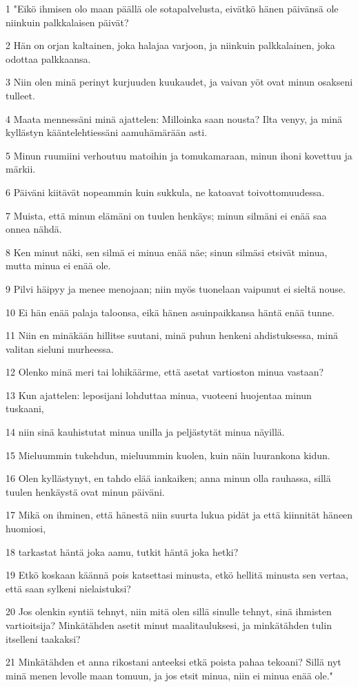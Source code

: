 \par 1 "Eikö ihmisen olo maan päällä ole sotapalvelusta, eivätkö hänen päivänsä ole niinkuin palkkalaisen päivät?
\par 2 Hän on orjan kaltainen, joka halajaa varjoon, ja niinkuin palkkalainen, joka odottaa palkkaansa.
\par 3 Niin olen minä perinyt kurjuuden kuukaudet, ja vaivan yöt ovat minun osakseni tulleet.
\par 4 Maata mennessäni minä ajattelen: Milloinka saan nousta? Ilta venyy, ja minä kyllästyn kääntelehtiessäni aamuhämärään asti.
\par 5 Minun ruumiini verhoutuu matoihin ja tomukamaraan, minun ihoni kovettuu ja märkii.
\par 6 Päiväni kiitävät nopeammin kuin sukkula, ne katoavat toivottomuudessa.
\par 7 Muista, että minun elämäni on tuulen henkäys; minun silmäni ei enää saa onnea nähdä.
\par 8 Ken minut näki, sen silmä ei minua enää näe; sinun silmäsi etsivät minua, mutta minua ei enää ole.
\par 9 Pilvi häipyy ja menee menojaan; niin myös tuonelaan vaipunut ei sieltä nouse.
\par 10 Ei hän enää palaja taloonsa, eikä hänen asuinpaikkansa häntä enää tunne.
\par 11 Niin en minäkään hillitse suutani, minä puhun henkeni ahdistuksessa, minä valitan sieluni murheessa.
\par 12 Olenko minä meri tai lohikäärme, että asetat vartioston minua vastaan?
\par 13 Kun ajattelen: leposijani lohduttaa minua, vuoteeni huojentaa minun tuskaani,
\par 14 niin sinä kauhistutat minua unilla ja peljästytät minua näyillä.
\par 15 Mieluummin tukehdun, mieluummin kuolen, kuin näin luurankona kidun.
\par 16 Olen kyllästynyt, en tahdo elää iankaiken; anna minun olla rauhassa, sillä tuulen henkäystä ovat minun päiväni.
\par 17 Mikä on ihminen, että hänestä niin suurta lukua pidät ja että kiinnität häneen huomiosi,
\par 18 tarkastat häntä joka aamu, tutkit häntä joka hetki?
\par 19 Etkö koskaan käännä pois katsettasi minusta, etkö hellitä minusta sen vertaa, että saan sylkeni nielaistuksi?
\par 20 Jos olenkin syntiä tehnyt, niin mitä olen sillä sinulle tehnyt, sinä ihmisten vartioitsija? Minkätähden asetit minut maalitauluksesi, ja minkätähden tulin itselleni taakaksi?
\par 21 Minkätähden et anna rikostani anteeksi etkä poista pahaa tekoani? Sillä nyt minä menen levolle maan tomuun, ja jos etsit minua, niin ei minua enää ole."

